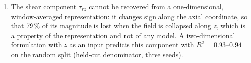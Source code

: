 \documentclass[subscriptcorrection,upint,varvw,barcolor=Goldenrod3,mathalfa=cal=euler,balance,hyphenate,french,pdf-a]{asmejour} %
\begin{document}
\begin{enumerate}
\item The shear component $\tau_{rz}$ cannot be recovered from a one-dimensional, window-averaged representation: it changes sign along the axial coordinate, so that 79\,\% of its magnitude is lost when the field is collapsed along $z$, which is a property of the representation and not of any model. A two-dimensional formulation with $z$ as an input predicts this component with $R^2 = 0.93$--$0.94$ on the random split (held-out denominator, three seeds). %

\end{enumerate}
\end{document}
